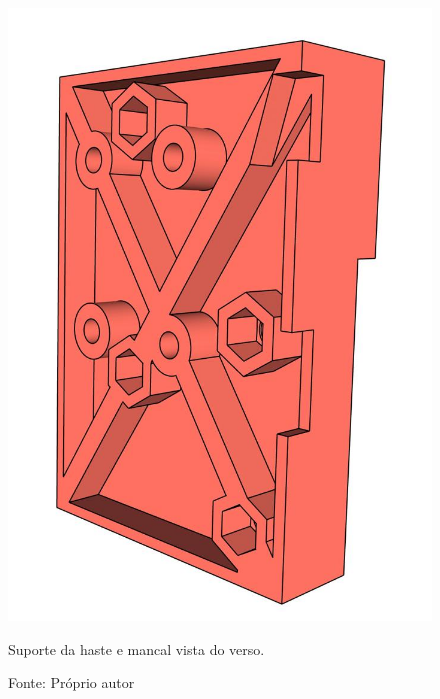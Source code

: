\begin{figure}[H]
\centering
\includegraphics[scale = 0.4]{figuras/ressuportehastemancalfv}
\caption{Suporte da haste e mancal vista do verso.}
\caption*{Fonte: Próprio autor}
\label{fig:ressuportehastemancalfv}
\end{figure}
        
